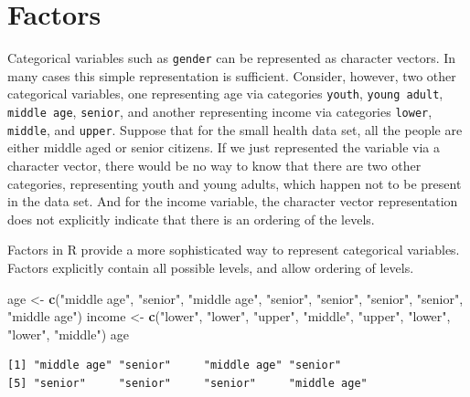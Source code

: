 \documentclass[
]{krantz}
\makeatletter
\newenvironment{Shaded}{\begin{snugshade}}{\end{snugshade}}
\newcommand{\KeywordTok}[1]{\textcolor[rgb]{0.27,0.27,0.27}{\textbf{#1}}}
\newcommand{\NormalTok}[1]{#1}
\newcommand{\StringTok}[1]{\textcolor[rgb]{0.5,0.5,0.5}{#1}}
\newenvironment{kframe}{%
\medskip{}
\setlength{\fboxsep}{.8em}
 \def\at@end@of@kframe{}%
 \ifinner\ifhmode%
  \def\at@end@of@kframe{\end{minipage}}%
  \begin{minipage}{\columnwidth}%
 \fi\fi%
 \def\FrameCommand##1{\hskip\@totalleftmargin \hskip-\fboxsep
 \colorbox{shadecolor}{##1}\hskip-\fboxsep
     \hskip-\linewidth \hskip-\@totalleftmargin \hskip\columnwidth}%
 \MakeFramed {\advance\hsize-\width
   \@totalleftmargin\z@ \linewidth\hsize
   \@setminipage}}%
 {\par\unskip\endMakeFramed%
 \at@end@of@kframe}
\renewenvironment{Shaded}{\begin{kframe}}{\end{kframe}}
\makeatother
\begin{document}
\hypertarget{factors}{%
\section{Factors}\label{factors}}

Categorical variables such as \texttt{gender} can be represented as character vectors. In many cases this simple representation is sufficient. Consider, however, two other categorical variables, one representing age via categories \texttt{youth}, \texttt{young\ adult}, \texttt{middle\ age}, \texttt{senior}, and another representing income via categories \texttt{lower}, \texttt{middle}, and \texttt{upper}. Suppose that for the small health data set, all the people are either middle aged or senior citizens. If we just represented the variable via a character vector, there would be no way to know that there are two other categories, representing youth and young adults, which happen not to be present in the data set. And for the income variable, the character vector representation does not explicitly indicate that there is an ordering of the levels.

Factors in R provide a more sophisticated way to represent categorical variables. Factors explicitly contain all possible levels, and allow ordering of levels.

\begin{Shaded}
\begin{Highlighting}[]
\NormalTok{age \textless{}{-}}\StringTok{ }\KeywordTok{c}\NormalTok{(}\StringTok{"middle age"}\NormalTok{, }\StringTok{"senior"}\NormalTok{, }\StringTok{"middle age"}\NormalTok{, }\StringTok{"senior"}\NormalTok{,}
         \StringTok{"senior"}\NormalTok{, }\StringTok{"senior"}\NormalTok{, }\StringTok{"senior"}\NormalTok{, }\StringTok{"middle age"}\NormalTok{)}
\NormalTok{income \textless{}{-}}\StringTok{ }\KeywordTok{c}\NormalTok{(}\StringTok{"lower"}\NormalTok{, }\StringTok{"lower"}\NormalTok{, }\StringTok{"upper"}\NormalTok{, }\StringTok{"middle"}\NormalTok{, }\StringTok{"upper"}\NormalTok{,}
            \StringTok{"lower"}\NormalTok{, }\StringTok{"lower"}\NormalTok{, }\StringTok{"middle"}\NormalTok{)}
\NormalTok{age}
\end{Highlighting}
\end{Shaded}

\begin{verbatim}
[1] "middle age" "senior"     "middle age" "senior"    
[5] "senior"     "senior"     "senior"     "middle age"
\end{verbatim}
\end{document}
